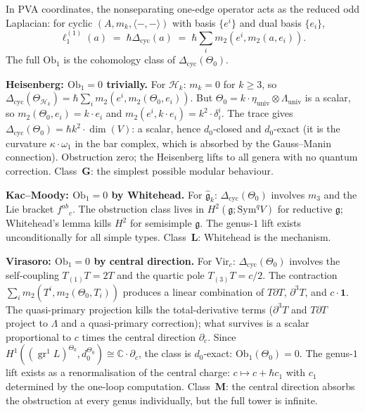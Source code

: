 \documentclass[11pt,reqno]{amsart}
\theoremstyle{definition}
\theoremstyle{remark}
\providecommand{\cH}{\mathcal{H}}
\providecommand{\Sym}{\mathrm{Sym}}
\providecommand{\fg}{\mathfrak{g}}
\providecommand{\Vir}{\mathrm{Vir}}
\providecommand{\bC}{\mathbb{C}}
\providecommand{\Ob}{\mathrm{Ob}}
\DeclareMathOperator{\gr}{gr}
\numberwithin{equation}{section}
\begin{document}
In PVA coordinates, the nonseparating one-edge operator acts
as the reduced odd Laplacian: for cyclic $(A, m_k, \langle-,-\rangle)$
with basis $\{e^i\}$ and dual basis $\{e_i\}$,
\[
\ell_1^{(1)}(a)
\;=\;
\hbar\Delta_{\mathrm{cyc}}(a)
\;=\;
\hbar\sum_i m_2(e^i, m_2(a, e_i)).
\]
The full $\Ob_1$ is the cohomology class of
$\Delta_{\mathrm{cyc}}(\Theta_0)$.

\medskip
\noindent\textbf{Heisenberg: $\Ob_1 = 0$ trivially.}\enspace
For $\cH_k$: $m_k = 0$ for $k \ge 3$, so
$\Delta_{\mathrm{cyc}}(\Theta_{\cH_k}) = \hbar \sum_i
m_2(e^i, m_2(\Theta_0, e_i))$. But $\Theta_0 = k \cdot
\eta_{\mathrm{univ}} \otimes \Lambda_{\mathrm{univ}}$ is a
scalar, so $m_2(\Theta_0, e_i) = k \cdot e_i$ and
$m_2(e^i, k \cdot e_i) = k^2 \cdot \delta^i_i$. The trace
gives $\Delta_{\mathrm{cyc}}(\Theta_0) = \hbar k^2 \cdot
\dim(V)$: a scalar, hence $d_0$-closed and $d_0$-exact (it is
the curvature $\kappa \cdot \omega_1$ in the bar complex, which
is absorbed by the Gauss--Manin connection). Obstruction zero;
the Heisenberg lifts to all genera with no quantum correction.
Class~$\mathbf{G}$: the simplest possible modular behaviour.

\medskip
\noindent\textbf{Kac--Moody: $\Ob_1 = 0$ by Whitehead.}\enspace
For $\widehat{\fg}_k$: $\Delta_{\mathrm{cyc}}(\Theta_0)$
involves $m_3$ and the Lie bracket $f^{ab}{}_c$. The
obstruction class lives in $H^2(\fg; \Sym^q V)$ for reductive
$\fg$; Whitehead's lemma kills $H^2$ for semisimple $\fg$.
The genus-$1$ lift exists unconditionally for all simple types.
Class~$\mathbf{L}$: Whitehead is the mechanism.

\medskip
\noindent\textbf{Virasoro: $\Ob_1 = 0$ by central direction.}\enspace
For $\Vir_c$: $\Delta_{\mathrm{cyc}}(\Theta_0)$ involves the
self-coupling $T_{(1)}T = 2T$ and the quartic pole $T_{(3)}T = c/2$.
The contraction $\sum_i m_2(T^i, m_2(\Theta_0, T_i))$ produces a
linear combination of $T\partial T$, $\partial^3 T$, and
$c \cdot \mathbf{1}$. The quasi-primary projection kills the
total-derivative terms ($\partial^3 T$ and $T\partial T$ project to
$\Lambda$ and a quasi-primary correction); what survives is a
scalar proportional to $c$ times the central direction
$\partial_c$. Since $H^1((\gr^1 L)^{\Theta_0}, d_0^{\Theta_0})
\cong \bC \cdot \partial_c$, the class is $d_0$-exact:
$\Ob_1(\Theta_0) = 0$. The genus-$1$ lift exists as a
renormalisation of the central charge: $c \mapsto c + \hbar c_1$
with $c_1$ determined by the one-loop computation.
Class~$\mathbf{M}$: the central direction absorbs the obstruction
at every genus individually, but the full tower is infinite.
\end{document}
